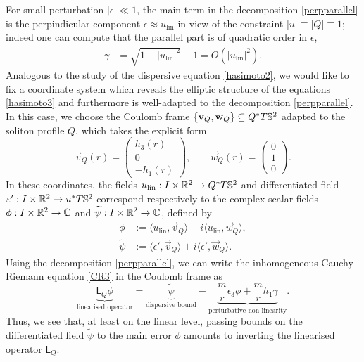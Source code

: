 For small perturbation $|\epsilon| \ll 1$, the main term in the decomposition \eqref{perpparallel} is the perpindicular component $\epsilon \approx u_{\mathrm{lin}}$ in view of the constraint $|u| \equiv |Q| \equiv 1$; indeed one can compute that the parallel part is of quadratic order in $\epsilon$, 
\begin{align*}
    \gamma 
        &= \sqrt{1 - |u_{\mathrm{lin}}|^2} - 1 = O(|u_{\mathrm{lin}}|^2).
\end{align*}
Analogous to the study of the dispersive equation \eqref{hasimoto2}, we would like to fix a coordinate system which reveals the elliptic structure of the equations \eqref{hasimoto3} and furthermore is well-adapted to the decomposition \eqref{perpparallel}. In this case, we choose the Coulomb frame $\{\mathbf v_Q, \mathbf w_Q \} \subseteq Q^* T\mathbb S^2$ adapted to the soliton profile $Q$, which takes the explicit form 
\begin{equation}\label{eq:coulombQframe}
        \vec v_Q (r) 
            = \begin{pmatrix} h_3 (r) \\ 0 \\ - h_1 (r) \end{pmatrix},
        \qquad
        \vec w_Q (r) 
            = \begin{pmatrix} 0 \\ 1 \\ 0 \end{pmatrix}. 
\end{equation}
In these coordinates, the fields $u_{\mathrm{lin}} : I \times \mathbb R^2 \to Q^* T\mathbb S^2$ and differentiated field $\varepsilon' : I \times \mathbb R^2 \to u^* T\mathbb S^2$ correspond respectively to the complex scalar fields $\phi : I \times \mathbb R^2 \to \mathbb C$ and $\widetilde{\psi} : I \times \mathbb R^2 \to \mathbb C$, defined by 
    \begin{align*}
        \phi
            &:= \big\langle  u_{\mathrm{lin}}, \vec v_Q \big\rangle + i \big\langle u_{\mathrm{lin}}, \vec w_Q \big\rangle,\\
        \widetilde{\psi} 
            &:= \big\langle  \epsilon' , \vec v_Q \big\rangle + i \big\langle \epsilon', \vec w_Q \big\rangle.
    \end{align*}
Using the decomposition \eqref{perpparallel}, we can write the  inhomogeneous Cauchy-Riemann equation \eqref{CR3} in the Coulomb frame as 
\begin{equation}\label{eq:CRcoulomb}
    \underbrace{\mathsf L_Q \phi}_{\text{linearised operator}} 
        = \underbrace{\widetilde{\psi}}_{\text{dispersive bound}} - \underbrace{\frac{m}{r} \epsilon_3 \phi + \frac{m}{r} h_1 \gamma}_{\text{perturbative non-linearity}}. 
\end{equation}    
Thus, we see that, at least on the linear level, passing bounds on the differentiated field $\widetilde{\psi}$ to the main error $\phi$ amounts to inverting the linearised operator $\mathsf L_Q$. 

